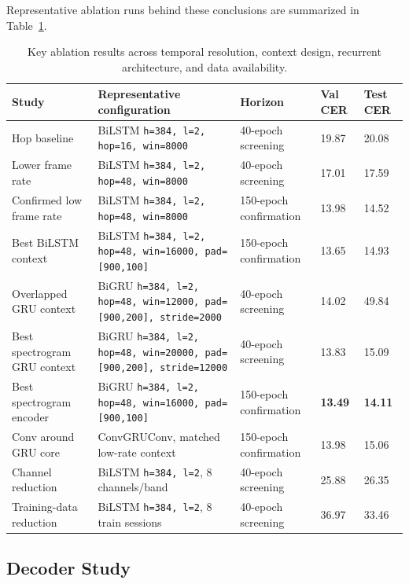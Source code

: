 Representative ablation runs behind these conclusions are summarized in Table~\ref{tab:ablations}.

\begin{table}[!htbp]
\centering
\small
\caption{Key ablation results across temporal resolution, context design, recurrent architecture, and data availability.}
\label{tab:ablations}
\begin{tabular}{p{2.8cm}p{6.0cm}p{2.2cm}p{1.1cm}p{1.1cm}}
\hline
Study & Representative configuration & Horizon & Val CER & Test CER \\
\hline
Hop baseline & BiLSTM \texttt{h=384, l=2, hop=16, win=8000} & 40-epoch screening & 19.87 & 20.08 \\
Lower frame rate & BiLSTM \texttt{h=384, l=2, hop=48, win=8000} & 40-epoch screening & 17.01 & 17.59 \\
Confirmed low frame rate & BiLSTM \texttt{h=384, l=2, hop=48, win=8000} & 150-epoch confirmation & 13.98 & 14.52 \\
Best BiLSTM context & BiLSTM \texttt{h=384, l=2, hop=48, win=16000, pad=[900,100]} & 150-epoch confirmation & 13.65 & 14.93 \\
Overlapped GRU context & BiGRU \texttt{h=384, l=2, hop=48, win=12000, pad=[900,200], stride=2000} & 40-epoch screening & 14.02 & 49.84 \\
Best spectrogram GRU context & BiGRU \texttt{h=384, l=2, hop=48, win=20000, pad=[900,200], stride=12000} & 40-epoch screening & 13.83 & 15.09 \\
Best spectrogram encoder & BiGRU \texttt{h=384, l=2, hop=48, win=16000, pad=[900,100]} & 150-epoch confirmation & \textbf{13.49} & \textbf{14.11} \\
Conv around GRU core & ConvGRUConv, matched low-rate context & 150-epoch confirmation & 13.98 & 15.06 \\
Channel reduction & BiLSTM \texttt{h=384, l=2}, 8 channels/band & 40-epoch screening & 25.88 & 26.35 \\
Training-data reduction & BiLSTM \texttt{h=384, l=2}, 8 train sessions & 40-epoch screening & 36.97 & 33.46 \\
\hline
\end{tabular}
\end{table}

\FloatBarrier
\subsection{Decoder Study}

